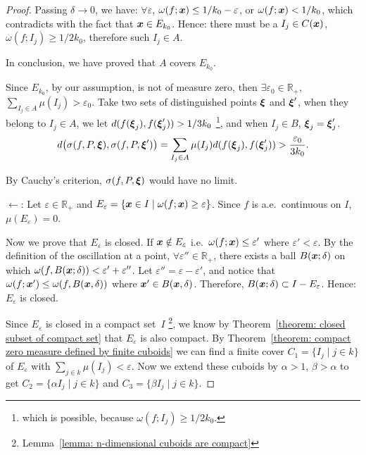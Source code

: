 \documentclass[openany]{book}
\begin{document}
\begin{proof}
	Passing $\delta \to 0$, we have: $\forall \varepsilon$, $\omega(f; \boldsymbol{x}) \leq 1/k_0 - \varepsilon$, or $\omega(f; \boldsymbol{x}) < 1/k_0$, which contradicts with the fact that $\boldsymbol{x} \in E_{k_0}$. Hence: there must be a $I_j \in C(\boldsymbol{x})$, $\omega(f; I_j) \geq 1/2k_0$, therefore such $I_j \in A$.

	In conclusion, we have proved that $A$ covers $E_{k_0}$. 

	Since $E_{k_0}$, by our assumption, is not of measure zero, then $\exists \varepsilon_0 \in \mathbb R_+$, $\sum_{I_j \in A} \mu(I_j) > \varepsilon_0$. Take two sets of distinguished points $\boldsymbol{\xi}$ and $\boldsymbol{\xi}'$, when they belong to $I_j \in A$, we let $d(f(\boldsymbol{\xi}_j), f(\boldsymbol{\xi}'_j)) > 1/3k_0$
		\footnote{which is possible, because $\omega(f; I_j) \geq 1/2k_0$.}, and when $I_j \in B$, $\boldsymbol{\xi}_j = \boldsymbol{\xi}'_j$.
	\begin{equation*}
		d\big(\sigma(f, P, \boldsymbol{\xi}), \sigma(f, P, \boldsymbol{\xi}')\big) 
		= \sum_{I_j \in A} \mu(I_j) d(f(\boldsymbol{\xi}_j), f(\boldsymbol{\xi}'_j))
		> \frac{\varepsilon_0}{3k_0} .
	\end{equation*}

	By Cauchy's criterion, $\sigma(f, P, \boldsymbol{\xi})$ would have no limit.

	$\gets$: Let $\varepsilon \in \mathbb R_+$ and $E_\varepsilon = \{\boldsymbol{x} \in I \mid \omega(f; \boldsymbol{x}) \geq \varepsilon\}$. Since $f$ is a.e.\ continuous on $I$, $\mu(E_\varepsilon) = 0$.

	Now we prove that $E_\varepsilon$ is closed. If $\boldsymbol{x} \notin E_\varepsilon$ i.e.\ $\omega(f; \boldsymbol{x}) \leq \varepsilon'$ where $\varepsilon' < \varepsilon$. 
	By the definition of the oscillation at a point, $\forall \varepsilon'' \in \mathbb R_+$, there exists a ball $B(\boldsymbol{x}; \delta)$ on which $\omega(f, B(\boldsymbol{x}; \delta)) < \varepsilon' + \varepsilon''$. 
	Let $\varepsilon'' = \varepsilon - \varepsilon'$, and notice that $\omega(f; \boldsymbol{x}') \leq \omega(f, B(\boldsymbol{x}, \delta))$ where $\boldsymbol{x}' \in B(\boldsymbol{x}, \delta)$. 
	Therefore, $B(\boldsymbol{x}; \delta) \subset I - E_\varepsilon$. 
	Hence: $E_\varepsilon$ is closed. 
	
	Since $E_\varepsilon$ is closed in a compact set~$I$
		\footnote{Lemma~\ref{lemma: n-dimensional cuboids are compact}}, 
	we know by Theorem~\ref{theorem: closed subset of compact set} that $E_\varepsilon$ is also compact. 
	By Theorem~\ref{theorem: compact zero measure defined by finite cuboids} we can find a finite cover $C_1 = \{I_j \mid j \in k\}$ of $E_\varepsilon$ with $\sum_{j \in k} \mu(I_j) < \varepsilon$. Now we extend these cuboids by $\alpha > 1$, $\beta > \alpha$ to get $C_2 = \{\alpha I_j \mid j \in k\}$ and $C_3 = \{\beta I_j \mid j \in k\}$.


\end{proof}
\end{document}
